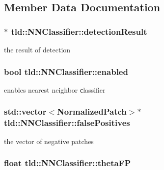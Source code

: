 \subsection{Member Data Documentation}
\hypertarget{classtld_1_1NNClassifier_a5320e517bb5ad4ed524701df5cc200aa}{
\subsubsection[{detection\-Result}]{$\ast$ tld\-::\-N\-N\-Classifier\-::detection\-Result}}\label{classtld_1_1NNClassifier_a5320e517bb5ad4ed524701df5cc200aa}


the result of detection 

\hypertarget{classtld_1_1NNClassifier_a7a86c7c4d1bf5664540f476f455dad21}{
\subsubsection[{enabled}]{\setlength{\rightskip}{0pt plus 5cm}bool tld\-::\-N\-N\-Classifier\-::enabled}}\label{classtld_1_1NNClassifier_a7a86c7c4d1bf5664540f476f455dad21}


enables nearest neighbor сlassifier 

\hypertarget{classtld_1_1NNClassifier_abc088471e8f9e259cc07cbb9a704fb28}{
\subsubsection[{false\-Positives}]{\setlength{\rightskip}{0pt plus 5cm}std\-::vector$<${\bf Normalized\-Patch}$>$$\ast$ tld\-::\-N\-N\-Classifier\-::false\-Positives}}\label{classtld_1_1NNClassifier_abc088471e8f9e259cc07cbb9a704fb28}


the vector of negative patches 

\hypertarget{classtld_1_1NNClassifier_a5cddbd7f4a38e95a7f00cb1013962b9e}{
\subsubsection[{theta\-F\-P}]{\setlength{\rightskip}{0pt plus 5cm}float tld\-::\-N\-N\-Classifier\-::theta\-F\-P}}\label{classtld_1_1NNClassifier_a5cddbd7f4a38e95a7f00cb1013962b9e}


